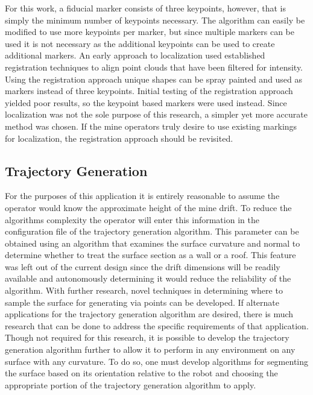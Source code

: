 For this work, a fiducial marker consists of three keypoints, however, that is simply the minimum number of keypoints necessary. The algorithm can easily be modified to use more keypoints per marker, but since multiple markers can be used it is not necessary as the additional keypoints can be used to create additional markers. An early approach to localization used established registration techniques to align point clouds that have been filtered for intensity. Using the registration approach unique shapes can be spray painted and used as markers instead of three keypoints. Initial testing of the registration approach yielded poor results, so the keypoint based markers were used instead. Since localization was not the sole purpose of this research, a simpler yet more accurate method was chosen. If the mine operators truly desire to use existing markings for localization, the registration approach should be revisited.\\

\subsection{Trajectory Generation}

For the purposes of this application it is entirely reasonable to assume the operator would know the approximate height of the mine drift. To reduce the algorithms complexity the operator will enter this information in the configuration file of the trajectory generation algorithm. This parameter can be obtained using an algorithm that examines the surface curvature and normal to determine whether to treat the surface section as a wall or a roof. This feature was left out of the current design since the drift dimensions will be readily available and autonomously determining it would reduce the reliability of the algorithm. With further research, novel techniques in determining where to sample the surface for generating via points can be developed. If alternate applications for the trajectory generation algorithm are desired, there is much research that can be done to address the specific requirements of that application. Though not required for this research, it is possible to develop the trajectory generation algorithm further to allow it to perform in any environment on any surface with any curvature. To do so, one must develop algorithms for segmenting the surface based on its orientation relative to the robot and choosing the appropriate portion of the trajectory generation algorithm to apply.\\

